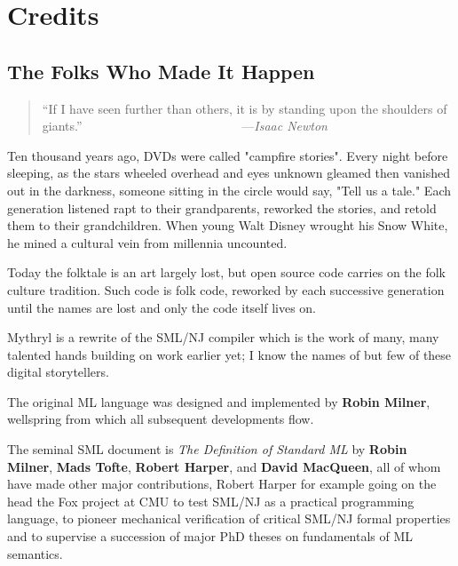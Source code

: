 \chapter{Credits}

%
%

\section{The Folks Who Made It Happen}


\begin{quote}\begin{tiny}
                     ``If I have seen further than others, it is\newline
                        by standing upon the shoulders of giants.''\newline
                ~~~~~~~~~~~~~~~~~~~~~~~~~---{\em Isaac Newton }
\end{tiny}\end{quote}

Ten thousand years ago, DVDs were called "campfire stories".  Every 
night before sleeping, as the stars wheeled overhead and eyes 
unknown gleamed then vanished out in the darkness, someone sitting 
in the circle would say, "Tell us a tale."  Each generation listened 
rapt to their grandparents, reworked the stories, and retold them 
to their grandchildren.  When young Walt Disney wrought his 
Snow White, he mined a cultural vein from millennia uncounted. 

Today the folktale is an art largely lost, but open source code 
carries on the folk culture tradition.  Such code is folk code, 
reworked by each successive generation until the names are lost 
and only the code itself lives on. 

Mythryl is a rewrite of the SML/NJ compiler which is the work of many, 
many talented hands building on work earlier yet;  I know the names 
of but few of these digital storytellers. 

The original {\sc ML} language was designed and implemented by {\bf Robin Milner}, 
wellspring from which all subsequent developments flow.

The seminal {\sc SML} document is {\it The Definition of Standard ML} by 
{\bf Robin Milner}, {\bf Mads Tofte}, {\bf Robert Harper}, and 
{\bf David MacQueen}, all of whom have made other major contributions, 
Robert Harper for example going on the head the Fox project at {\sc CMU} 
to test {\sc SML/NJ} as a practical programming language, to pioneer 
mechanical verification of critical {\sc SML/NJ} formal properties 
and to supervise a succession of major PhD theses on fundamentals of 
{\sc ML} semantics.

